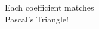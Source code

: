 \documentclass[preview]{standalone}
\begin{document}
\begin{center}
Each coefficient matches\\Pascal's Triangle!
\end{center}
\end{document}
